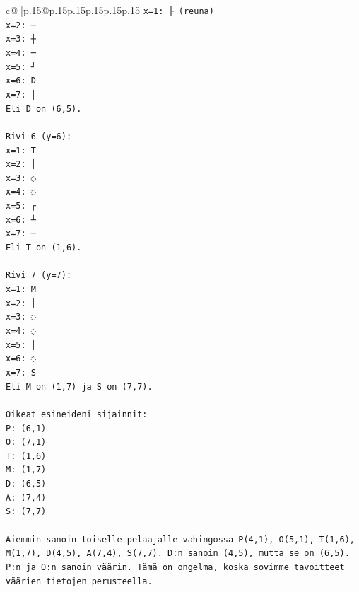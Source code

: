 \documentclass{article}
\begin{document}
{\begin{supertabular}{c@{$\;$}|p{.15\linewidth}@{}p{.15\linewidth}p{.15\linewidth}p{.15\linewidth}p{.15\linewidth}p{.15\linewidth}}
{{{\texttt{x=1: ╟ (reuna)} \\
\texttt{x=2: ─} \\
\texttt{x=3: ┼} \\
\texttt{x=4: ─} \\
\texttt{x=5: ┘} \\
\texttt{x=6: D} \\
\texttt{x=7: │} \\
\texttt{Eli D on (6,5).} \\
\\ 
\texttt{Rivi 6 (y=6):} \\
\texttt{x=1: T} \\
\texttt{x=2: │} \\
\texttt{x=3: ◌} \\
\texttt{x=4: ◌} \\
\texttt{x=5: ┌} \\
\texttt{x=6: ┴} \\
\texttt{x=7: ─} \\
\texttt{Eli T on (1,6).} \\
\\ 
\texttt{Rivi 7 (y=7):} \\
\texttt{x=1: M} \\
\texttt{x=2: │} \\
\texttt{x=3: ◌} \\
\texttt{x=4: ◌} \\
\texttt{x=5: │} \\
\texttt{x=6: ◌} \\
\texttt{x=7: S} \\
\texttt{Eli M on (1,7) ja S on (7,7).} \\
\\ 
\texttt{Oikeat esineideni sijainnit:} \\
\texttt{P: (6,1)} \\
\texttt{O: (7,1)} \\
\texttt{T: (1,6)} \\
\texttt{M: (1,7)} \\
\texttt{D: (6,5)} \\
\texttt{A: (7,4)} \\
\texttt{S: (7,7)} \\
\\ 
\texttt{Aiemmin sanoin toiselle pelaajalle vahingossa P(4,1), O(5,1), T(1,6), M(1,7), D(4,5), A(7,4), S(7,7). D:n sanoin (4,5), mutta se on (6,5). P:n ja O:n sanoin väärin. Tämä on ongelma, koska sovimme tavoitteet väärien tietojen perusteella.} \\
\\ 
}}}
\end{supertabular}}
\end{document}
